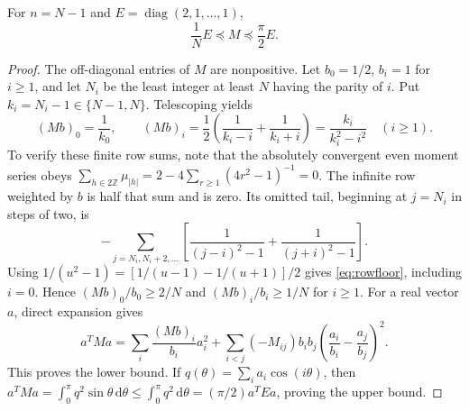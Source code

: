 \documentclass{siamart251216}
\newcommand{\dd}{\,\mathrm d}
\DeclareMathOperator{\diag}{diag}
\begin{document}
\begin{lemma}\label{lem:floor}%
For $n=N-1$ and $E=\diag(2,1,\ldots,1)$,
\begin{equation}\label{eq:floor}
 \frac1N E\preceq M\preceq\frac\pi2 E.
\end{equation}
\end{lemma}
\begin{proof}
The off-diagonal entries of $M$ are nonpositive. Let $b_0=1/2$,
$b_i=1$ for $i\ge1$, and let $N_i$ be the least integer at least $N$
having the parity of $i$. Put $k_i=N_i-1\in\{N-1,N\}$. Telescoping yields
\begin{equation}\label{eq:rowfloor}
 (Mb)_0=\frac1{k_0},\qquad
 (Mb)_i=\frac12\left(\frac1{k_i-i}+\frac1{k_i+i}\right)
       =\frac{k_i}{k_i^2-i^2}\quad(i\ge1).
\end{equation}
To verify these finite row sums, note that the absolutely convergent
even moment series obeys
$\sum_{h\in2\mathbb Z}\mu_{|h|}=2-4\sum_{r\ge1}(4r^2-1)^{-1}=0$.
The infinite row weighted by $b$ is half that sum and is zero.
Its omitted tail, beginning at $j=N_i$ in steps of two, is
\[
 -\sum_{j=N_i,N_i+2,\ldots}
 \left[\frac1{(j-i)^2-1}+\frac1{(j+i)^2-1}\right].
\]
Using $1/(u^2-1)=[1/(u-1)-1/(u+1)]/2$ gives
\eqref{eq:rowfloor}, including $i=0$. Hence
$(Mb)_0/b_0\ge2/N$ and $(Mb)_i/b_i\ge1/N$ for $i\ge1$.
For a real vector $a$, direct expansion gives
\[
 a^TMa=\sum_i\frac{(Mb)_i}{b_i}a_i^2
 +\sum_{i<j}(-M_{ij})b_i b_j
             \left(\frac{a_i}{b_i}-\frac{a_j}{b_j}\right)^2.
\]
This proves the lower bound. If $q(\theta)=\sum_i a_i\cos(i\theta)$,
then $a^TMa=\int_0^\pi q^2\sin\theta\dd\theta
\le\int_0^\pi q^2\dd\theta=(\pi/2)a^TEa$, proving the upper bound.
\end{proof}
\end{document}
